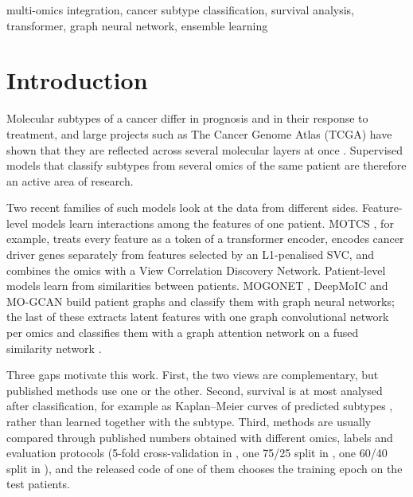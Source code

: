 \documentclass[conference]{IEEEtran}
\begin{document}
\begin{IEEEkeywords}
multi-omics integration, cancer subtype classification, survival analysis, transformer, graph neural network, ensemble learning
\end{IEEEkeywords}

\section{Introduction}
Molecular subtypes of a cancer differ in prognosis and in their response to treatment, and large projects such as The
Cancer Genome Atlas (TCGA) have shown that they are reflected across several molecular layers at once
\cite{weinstein2013tcga,hoadley2018pancan}. Supervised models that classify subtypes from several omics of the same
patient are therefore an active area of research.

Two recent families of such models look at the data from different sides. Feature-level models learn interactions
among the features of one patient. MOTCS \cite{meng2026motcs}, for example, treats every feature as a token of a
transformer encoder, encodes cancer driver genes separately from features selected by an L1-penalised SVC, and
combines the omics with a View Correlation Discovery Network. Patient-level models learn from similarities between
patients. MOGONET \cite{wang2021mogonet}, DeepMoIC \cite{wu2024deepmoic} and MO-GCAN \cite{dou2025mogcan} build
patient graphs and classify them with graph neural networks; the last of these extracts latent features with one graph
convolutional network per omics and classifies them with a graph attention network on a fused similarity network
\cite{wang2014snf}.

Three gaps motivate this work. First, the two views are complementary, but published methods use one or the other.
Second, survival is at most analysed after classification, for example as Kaplan--Meier curves of predicted subtypes
\cite{wu2024deepmoic}, rather than learned together with the subtype. Third, methods are usually compared through
published numbers obtained with different omics, labels and evaluation protocols (5-fold cross-validation in
\cite{meng2026motcs}, one 75/25 split in \cite{dou2025mogcan}, one 60/40 split in \cite{wu2024deepmoic}), and the
released code of one of them chooses the training epoch on the test patients.
\end{document}
